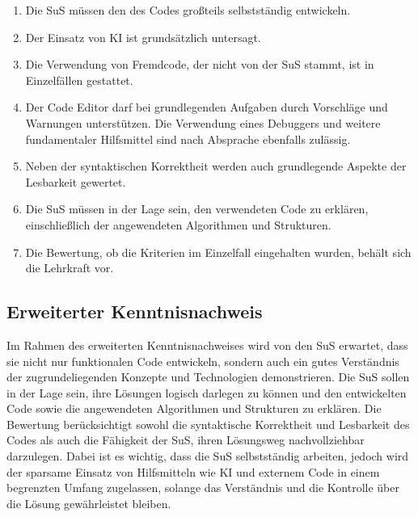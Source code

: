 \documentclass[a4paper,12pt]{article}
\begin{document}
\begin{enumerate}[label=\S\ \arabic*]
    \item Die SuS müssen den des Codes großteils selbstständig entwickeln.
    \item Der Einsatz von KI ist grundsätzlich untersagt.
    \item Die Verwendung von Fremdcode, der nicht von der SuS stammt, ist in Einzelfällen  gestattet.
    \item Der Code Editor darf bei grundlegenden Aufgaben durch Vorschläge und Warnungen unterstützen. Die Verwendung eines Debuggers und weitere fundamentaler Hilfsmittel sind nach Absprache ebenfalls zulässig.
    \item Neben der syntaktischen Korrektheit werden auch grundlegende Aspekte der Lesbarkeit gewertet.
    \item Die SuS müssen in der Lage sein, den verwendeten Code zu erklären, einschließlich der angewendeten Algorithmen und Strukturen.
    \item Die Bewertung, ob die Kriterien im Einzelfall eingehalten wurden, behält sich die Lehrkraft vor.
\end{enumerate}


\subsection{Erweiterter Kenntnisnachweis}
Im Rahmen des erweiterten Kenntnisnachweises wird von den SuS erwartet, dass sie nicht nur funktionalen Code entwickeln, sondern auch ein gutes Verständnis der zugrundeliegenden Konzepte und Technologien demonstrieren. Die SuS sollen in der Lage sein, ihre Lösungen logisch darlegen zu können und den entwickelten Code sowie die angewendeten Algorithmen und Strukturen zu erklären. Die Bewertung berücksichtigt sowohl die syntaktische Korrektheit und Lesbarkeit des Codes als auch die Fähigkeit der SuS, ihren Lösungsweg nachvollziehbar darzulegen. Dabei ist es wichtig, dass die SuS selbstständig arbeiten, jedoch wird der sparsame Einsatz von Hilfsmitteln wie KI und externem Code in einem begrenzten Umfang zugelassen, solange das Verständnis und die Kontrolle über die Lösung gewährleistet bleiben.
\end{document}
